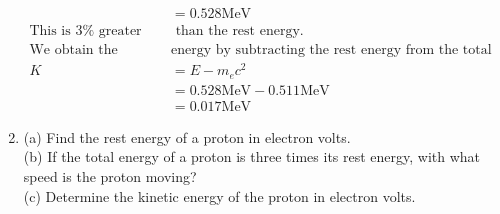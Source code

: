 \begin{enumerate}[ label=\color{ocre}\textbf{\arabic*.}]
\begin{answer}
\begin{align*}
		&=0.528 \mathrm{MeV}\\
		\text{This is $3 \%$ greater}&\text{ than the rest energy.}\\
		\text{We obtain the kinetic }&\text{energy by subtracting the rest energy from the total energy:}\\
		K&=E-m_{e} c^{2}\\&=0.528 \mathrm{MeV}-0.511 \mathrm{MeV}\\&=0.017 \mathrm{MeV}
		\end{align*}
	\end{answer}
	\item (a) Find the rest energy of a proton in electron volts.
	\\(b) If the total energy of a proton is three times its rest energy, with what speed is the proton moving?
	\\(c) Determine the kinetic energy of the proton in electron volts.


\end{enumerate}
